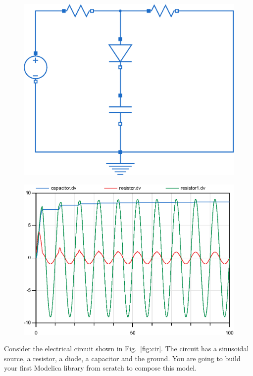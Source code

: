 \documentclass[10pt,a4paper]{article}
\begin{document}
\begin{figure}[h]
	\centering
	\begin{minipage}{.4\textwidth}
		\centering
		\includegraphics[width=1\linewidth]{images/circuit.eps}
		\label{fig:cir}
	\end{minipage}%
	\begin{minipage}{.6\textwidth}
		\centering
		\includegraphics[width=.8\linewidth]{images/result.eps}
		\label{fig:res}
	\end{minipage}
\end{figure}


Consider the electrical circuit shown in Fig.~\ref{fig:cir}. The circuit has a sinusoidal source, a resistor, a diode, a capacitor and the ground. You are going to build your first Modelica library from scratch to compose this model.
\end{document}
